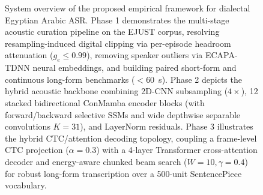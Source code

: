 \documentclass[journal]{IEEEtran}
\begin{document}
\begin{figure}[!t]
\caption{System overview of the proposed empirical framework for dialectal Egyptian Arabic ASR. Phase 1 demonstrates the multi-stage acoustic curation pipeline on the EJUST corpus, resolving resampling-induced digital clipping via per-episode headroom attenuation ($g_e \le 0.99$), removing speaker outliers via ECAPA-TDNN neural embeddings, and building paired short-form and continuous long-form benchmarks ($<60$~s). Phase 2 depicts the hybrid acoustic backbone combining 2D-CNN subsampling ($4\times$), 12 stacked bidirectional ConMamba encoder blocks (with forward/backward selective SSMs and wide depthwise separable convolutions $K=31$), and LayerNorm residuals. Phase 3 illustrates the hybrid CTC/attention decoding topology, coupling a frame-level CTC projection ($\alpha=0.3$) with a 4-layer Transformer cross-attention decoder and energy-aware chunked beam search ($W=10, \gamma=0.4$) for robust long-form transcription over a 500-unit SentencePiece vocabulary.}
\label{fig:framework_overview}
\end{figure}
\end{document}
